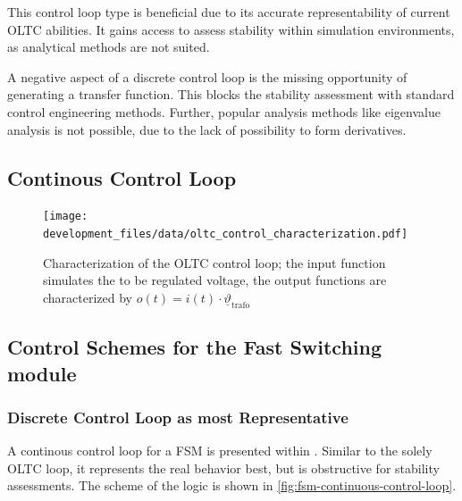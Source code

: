 This control loop type is beneficial due to its accurate representability of current \acs{OLTC} abilities. It gains access to assess stability within simulation environments, as analytical methods are not suited.

A negative aspect of a discrete control loop is the missing opportunity of generating a transfer function. This blocks the stability assessment with standard control engineering methods. Further, popular analysis methods like eigenvalue analysis is not possible, due to the lack of possibility to form derivatives.


\subsection{Continous Control Loop}

\begin{figure}[htb!]
        \centering
        \texttt{[image: development\_files/data/oltc\_control\_characterization.pdf]}
        \caption[short]{Characterization of the OLTC control loop; the input function simulates the to be regulated voltage, the output functions are characterized by $o(t)=i(t) \cdot \underline{\vartheta}_\mathrm{trafo}$}
        \label{fig:oltc-control-characterization}
\end{figure}

\subsection{Control Schemes for the Fast Switching module}

\subsubsection{Discrete Control Loop as most Representative}
A continous control loop for a \acs{FSM} is presented within \textcite{burlakinEnhancedVoltageControl2024,burlakinEnhancingVariableShunt2024}. Similar to the solely \acs{OLTC} loop, it represents the real behavior best, but is obstructive for stability assessments. The scheme of the logic is shown in \autoref{fig:fsm-continuous-control-loop}.

